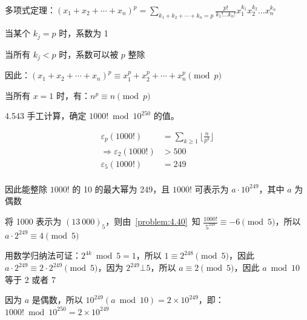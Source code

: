 多项式定理：\( (x_1 + x_2 + \cdots + x_n)^p = \sum_{k_1 + k_2 + \cdots + k_n = p} \frac{p!}{k_1! \dots k_n!} x_1^{k_1} x_2^{k_2} \dots x_n^{k_n} \)

当某个 \( k_j = p \) 时，系数为 1

当所有 \( k_j < p \) 时，系数可以被 \( p \) 整除

因此：\( (x_1 + x_2 + \cdots + x_n)^p \equiv x_1^{p} + x_2^{p} + \cdots + x_n^{p} \pmod{p} \)

当所有 \( x = 1 \) 时，有：\( n^p \equiv n \pmod{p} \)

\begin{problem}{4.54}{3}
  手工计算，确定 \( 1000! \bmod 10^{250} \) 的值。
\end{problem}

\begin{align*}
  \varepsilon_p (1000!) &= \sum_{k \ge 1} \lfloor \frac{n}{p^k} \rfloor \\
  \Rightarrow \varepsilon_2(1000!) &> 500 \\
  \varepsilon_5(1000!) &= 249 \\
\end{align*}

因此能整除 \( 1000! \) 的 10 的最大幂为 249，且 \( 1000! \) 可表示为 \( a \cdot 10^{249} \)，其中 \( a \) 为偶数

将 1000 表示为 \( (13 \ 000)_5 \)，则由~\ref{problem:4.40}~知 \( \frac{1000!}{5^{249}} \equiv -6 \pmod{5} \)，所以 \( a \cdot 2^{249} \equiv 4 \pmod{5} \)

用数学归纳法可证：\( 2^{4k} \bmod 5 = 1 \)，所以 \( 1 \equiv 2^{248} \pmod{5} \)，因此 \( a \cdot 2^{249} \equiv 2 \cdot 2^{249} \pmod{5} \)，因为 \( 2^{249} \bot 5 \)，所以 \( a \equiv 2 \pmod{5} \)，因此 \( a \bmod 10 \) 等于 2 或者 7

因为 \( a \) 是偶数，所以 \( 10^{249} (a \bmod 10 ) = 2 \times 10^{249} \)，即：\( 1000! \bmod 10^{250} = 2 \times 10^{249} \)
